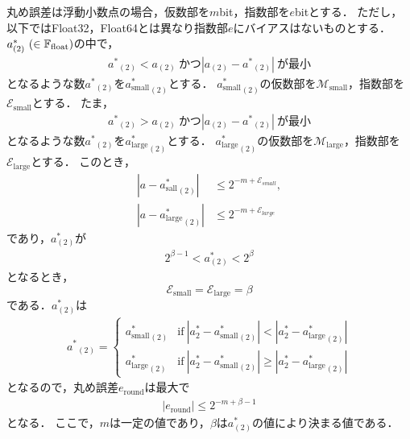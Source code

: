 丸め誤差は浮動小数点の場合，仮数部を$m$bit，指数部を$e$bitとする．
ただし，以下ではFloat32，Float64とは異なり指数部$e$にバイアスはないものとする．
$a^{\ast}_{(2)} \ (\in \mathbb{F}_{\text{float}})$の中で，
\begin{align*}
    {a^{\ast}}_{(2)} < a_{(2)}\ \text{かつ} |a_{(2)} - {a^{\ast}}_{(2)}| \ \text{が最小}
\end{align*}
となるような数${a^{\ast}}_{(2)}$を${a^{\ast}_{\mathrm{small}}}_{(2)}$とする．
${a^{\ast}_{\mathrm{small}}}_{(2)}$の仮数部を$\mathcal{M}_{\mathrm{small}}$，指数部を$\mathcal{E}_{\mathrm{small}}$とする．
たま，
\begin{align*}
    {a^{\ast}}_{(2)} > a_{(2)} \ \text{かつ} |a_{(2)} - {a^{\ast}}_{(2)}| \ \text{が最小}
\end{align*}
となるような数${a^{\ast}}_{(2)}$を${a^{\ast}_{\mathrm{large}}}_{(2)}$とする．
${a^{\ast}_{\mathrm{large}}}_{(2)}$の仮数部を$\mathcal{M}_{\mathrm{large}}$，指数部を$\mathcal{E}_{\mathrm{large}}$とする．
このとき，
\begin{align*}
    |a - {a^{\ast}_{\mathrm{sall}}}_{(2)}| &\leq 2^{-m+{\mathcal{E}_{small}}}, \\
    |a - {a^{\ast}_{\mathrm{large}}}_{(2)}| &\leq 2^{-m+{\mathcal{E}_{large}}}
\end{align*}
であり，$a^{\ast}_{(2)}$が
\begin{align*}
    2^{\beta -1} < a^{\ast}_{(2)} < 2^{\beta}
\end{align*}
となるとき，
\begin{equation*}
    \mathcal{E}_{\mathrm{small}} = \mathcal{E}_{\mathrm{large}} = \beta
\end{equation*}
である．$a^{\ast}_{(2)}$は
\begin{align*}
    {a^{\ast}}_{(2)} = \left\{ 
        \begin{array}{ll}
            {a^{\ast}_{\mathrm{small}}}_{(2)} &\text{if} \ |a^{\ast}_{2} - {a^{\ast}_{\mathrm{small}}}_{(2)} | < |a^{\ast}_{2} - {a^{\ast}_{\mathrm{large}}}_{(2)} | \\
            {a^{\ast}_{\mathrm{large}}}_{(2)} &\text{if} \ |a^{\ast}_{2} - {a^{\ast}_{\mathrm{small}}}_{(2)} | \geq |a^{\ast}_{2} - {a^{\ast}_{\mathrm{large}}}_{(2)} | 
        \end{array}
    \right.
\end{align*}
となるので，丸め誤差$e_{\mathrm{round}}$は最大で
\begin{align}
    \label{eq:rounderror_float}
    |e_{\mathrm{round}}| \leq 2^{-m+\beta -1}
\end{align}
となる．
ここで，$m$は一定の値であり，$\beta$は$a^{\ast}_{(2)}$の値により決まる値である．


